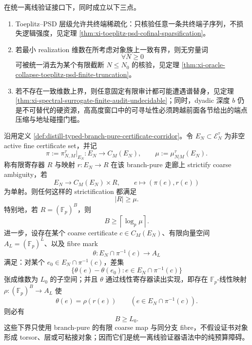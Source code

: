 \begin{proposition}\label{prop:typed-address-biaxial-completion-sparsification-depth}
在统一离线验证接口下，同时成立以下三点。
\begin{enumerate}
  \item Toeplitz--PSD 层级允许共终端稀疏化：只核验任意一条共终端子序列，不损失逻辑强度，见定理 \ref{thm:xi-toeplitz-psd-cofinal-sparsification}。
  \item 若最小 realization 维数在所考虑对象族上一致有界，则无穷量词
  \[
  \forall N\ge 0
  \]
  可被统一消去为某个有限截断 \(N\le N_0\) 的核验，见定理 \ref{thm:xi-oracle-collapse-toeplitz-psd-finite-truncation}。
  \item 若不存在一致维数上界，则任意固定有限审计都可能遭遇谱替身，见定理 \ref{thm:xi-spectral-surrogate-finite-audit-undecidable}；同时，dyadic 深度 \(b\) 仍是不可替代的硬资源，高高度窗口中的可寻址性必须跨越前面各节给出的端点压缩与地址碰撞门槛。
\end{enumerate}
\end{proposition}

\begin{proposition}\label{distill:wang_zahl-sticky_reduction_and_scale_saturated_closure-branch-pure-strictification-register-lower-bound}
沿用定义 \ref{def:distill-typed-branch-pure-certificate-corridor}。令 \(E_N\subset\mathcal E_N^\tau\) 为非空 active fine certificate set，并记
\[
\pi:=\pi_{N,M}^\tau|_{E_N}:E_N\to C_M(E_N),
\qquad
\mu:=\mu_{N|M}^\tau(E_N).
\]
称有限寄存器 \(R\) 与映射 \(r:E_N\to R\) 在该 branch-pure 走廊上 strictify coarse ambiguity，若
\[
E_N\longrightarrow C_M(E_N)\times R,
\qquad
e\longmapsto (\pi(e),r(e))
\]
为单射。则任何这样的 strictification 都满足
\[
|R|\ge\mu.
\]
特别地，若 \(R=(\mathbb F_p)^B\)，则
\[
B\ge \left\lceil\log_p\mu\right\rceil.
\]
进一步，设存在某个 coarse certificate \(c\in C_M(E_N)\)、有限向量空间 \(A_L=(\mathbb F_p)^L\)、以及 fibre mark
\[
\theta:E_N\cap\pi^{-1}(c)\to A_L
\]
满足：对某个 \(e_0\in E_N\cap\pi^{-1}(c)\)，差集
\[
\{\theta(e)-\theta(e_0):e\in E_N\cap\pi^{-1}(c)\}
\]
张成维数为 \(L_0\) 的子空间；并且 \(\theta\) 通过线性寄存器读出实现，即存在 \(\mathbb F_p\)-线性映射 \(\rho:(\mathbb F_p)^B\to A_L\) 使
\[
\theta(e)=\rho(r(e))
\qquad(e\in E_N\cap\pi^{-1}(c)).
\]
则必有
\[
B\ge L_0.
\]
这些下界只使用 branch-pure 的有限 coarse map 与同分支 fibre，不假设证书对象形成 torsor、层或可粘接对象；因而它们是统一离线验证器语法中的纯预算障碍。
\end{proposition}

